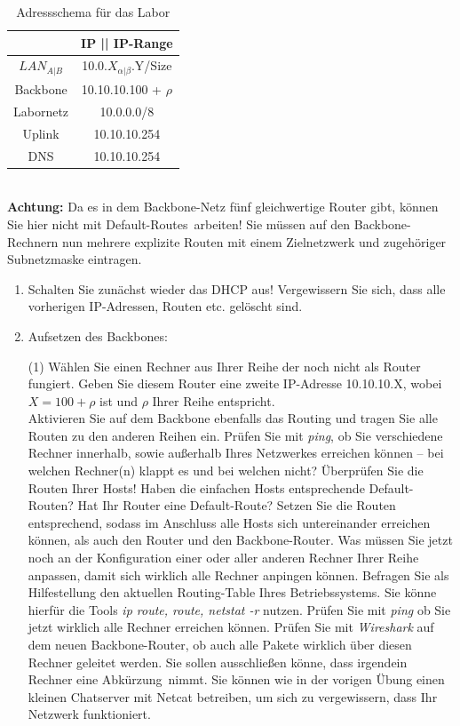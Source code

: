 \documentclass[paper=a4,fontsize=11pt]{scrartcl}%
\numberwithin{equation}{section}
\begin{document}
\begin{table}[H]
\caption{Adressschema für das Labor}
\label{adress_scheme}
\centering
\begin{tabular}{|c|c|}\hline
 & \textbf{IP  || IP-Range} \\ \hline
 $LAN_{A|B}$ & 10.0.$X_{\alpha|\beta}$.Y/Size \\ \hline
 Backbone & 10.10.10.100 + $\rho$ \\ \hline
 Labornetz & 10.0.0.0/8 \\ \hline
 Uplink & 10.10.10.254 \\ \hline
 DNS & 10.10.10.254 \\ \hline
\end{tabular}
\end{table} 
\vskip0.05in ~\\
\textbf{Achtung:} Da es in dem Backbone-Netz fünf gleichwertige Router gibt, können Sie hier nicht mit \glqq Default-Routes\grqq\ arbeiten! Sie müssen auf den Backbone-Rechnern nun mehrere explizite Routen mit einem Zielnetzwerk und zugehöriger Subnetzmaske eintragen.
\begin{enumerate}
	\item Schalten Sie zunächst wieder das DHCP aus! Vergewissern Sie sich, dass alle vorherigen IP-Adressen, Routen etc. gelöscht sind.
	\item Aufsetzen des Backbones:

\begin{tasks}(1)
	\task Wählen Sie einen Rechner aus Ihrer Reihe der noch nicht als Router fungiert. Geben Sie diesem Router eine zweite IP-Adresse 10.10.10.X, wobei $X=100 + \rho$ ist und $\rho$ Ihrer Reihe entspricht.\\
	\task Aktivieren Sie auf dem Backbone ebenfalls das Routing und tragen Sie alle Routen zu den anderen Reihen ein.
	\task Prüfen Sie mit \emph{ping}, ob Sie verschiedene Rechner innerhalb, sowie außerhalb Ihres Netzwerkes erreichen können -- bei welchen Rechner(n) klappt es und bei welchen nicht?
	\task Überprüfen Sie die Routen Ihrer Hosts! Haben die einfachen Hosts entsprechende Default-Routen? Hat Ihr Router eine Default-Route? Setzen Sie die Routen entsprechend, sodass im Anschluss alle Hosts sich untereinander erreichen können, als auch den Router und den Backbone-Router.
	\task Was müssen Sie jetzt noch an der Konfiguration einer oder aller anderen Rechner Ihrer Reihe anpassen, damit sich wirklich alle Rechner anpingen können.
	\task Befragen Sie als Hilfestellung den aktuellen Routing-Table Ihres Betriebssystems. Sie könne hierfür die Tools \emph{ip route, route, netstat -r} nutzen.
	\task Prüfen Sie mit \emph{ping} ob Sie jetzt wirklich alle Rechner erreichen können.
	\task Prüfen Sie mit \emph{Wireshark} auf dem neuen Backbone-Router, ob auch alle Pakete wirklich über diesen Rechner geleitet werden. Sie sollen ausschließen könne, dass irgendein Rechner eine \glqq Abkürzung\grqq\ nimmt.
	\task Sie können wie in der vorigen Übung einen kleinen Chatserver mit Netcat betreiben, um sich zu vergewissern, dass Ihr Netzwerk funktioniert.
\end{tasks}
\end{enumerate}
\end{document}
